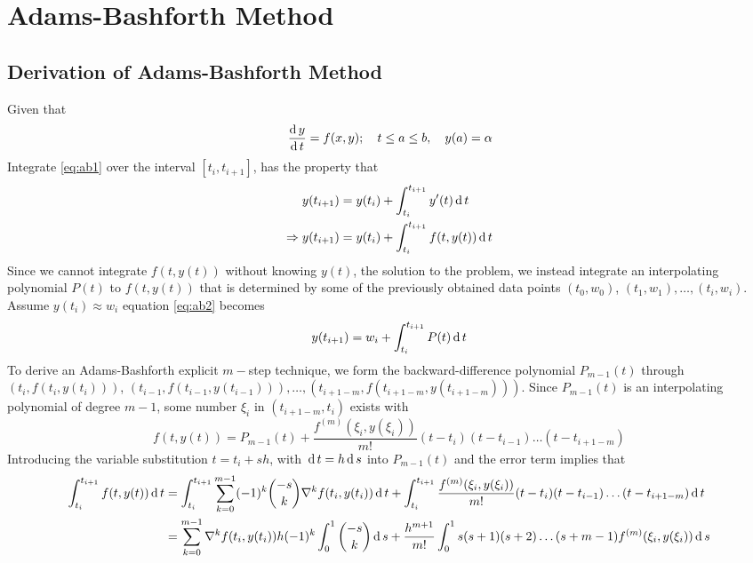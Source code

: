 \documentclass[../main-sheet.tex]{subfiles}
\begin{document}
\chapter{Adams-Bashforth Method}
\section{Derivation of Adams-Bashforth Method}
Given that
\begin{equation}
    \,\frac{\mathrm{d}\,y}{\mathrm{d}\,t}=f(x,y);\quad t\leq a\leq b,\quad y(a)=\alpha \label{eq:ab1}
\end{equation}
Integrate \eqref{eq:ab1} over the interval \([t_i,t_{i+1}]\), has the property that
\begin{align}
    & y(t_{i+1})=y(t_{i})+\int_{t_i}^{t_{i+1}}y'(t)\,\mathrm{d}\, t\notag\\
    \Rightarrow\;& y(t_{i+1})=y(t_{i})+\int_{t_i}^{t_{i+1}}f(t,y(t))\,\mathrm{d}\, t\label{eq:ab2}
\end{align}
Since we cannot integrate \(f(t,y(t))\) without knowing \(y(t)\), the solution to the problem, we instead integrate an interpolating polynomial \(P(t)\) to \(f(t,y(t))\) that is determined by some of the previously obtained data points \((t_0,w_0)\), \((t_1,w_1),\dots, (t_i,w_i)\). Assume \(y(t_i)\approx w_i\) equation \eqref{eq:ab2} becomes
\begin{equation}
    y(t_{i+1})=w_i+\int_{t_i}^{t_{i+1}}P(t)\,\mathrm{d}\, t \label{eq:ab3}
\end{equation}
To derive an Adams-Bashforth explicit \(m-\)step technique, we form the backward-difference polynomial \(P_{m-1}(t)\) through \((t_i,f(t_i,y(t_i)))\), \((t_{i-1},f(t_{i-1},y(t_{i-1}))),\dots, (t_{i+1-m},f(t_{i+1-m},y(t_{i+1-m})))\). Since \(P_{m-1}(t)\) is an interpolating polynomial of degree \(m-1\), some number \(\xi_i\) in \((t_{i+1-m},t_i)\) exists with
\[
    f(t,y(t))=P_{m-1}(t)+\frac{f^{(m)}(\xi_i,y(\xi_i))}{m!}(t-t_i)(t-t_{i-1})\dots (t-t_{i+1-m})
\]
Introducing the variable substitution \(t=t_i+sh\), with \(\,\mathrm{d}\, t=h\,\mathrm{d}\, s\) into \(P_{m-1}(t)\) and the error term implies that
\begin{align*}
    \int_{t_i}^{t_{i+1}} f(t,y(t))\,\mathrm{d}\, t&=\int_{t_i}^{t_{i+1}}\sum_{k=0}^{m-1}(-1)^k \binom{-s}{k}\nabla^k f(t_i,y(t_i))\,\mathrm{d}\, t+\int_{t_i}^{t_{i+1}}\frac{f^{(m)}(\xi_i,y(\xi_i))}{m!}(t-t_i)(t-t_{i-1})\dots(t-t_{i+1-m})\,\mathrm{d}\, t\\
    &=\sum_{k=0}^{m-1}\nabla^k f(t_i,y(t_i)) h (-1)^k \int_{0}^{1}\binom{-s}{k}\,\mathrm{d}\, s+\frac{h^{m+1}}{m!}\int_{0}^{1} s (s+1) (s+2)\dots(s+m-1) f^{(m)}(\xi_i,y(\xi_i))\,\mathrm{d}\, s
\end{align*}
\end{document}
